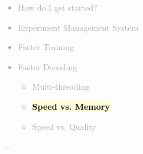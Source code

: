 \documentclass[landscape]{uedslides2C}
\newcommand{\currenttopic}[1]{\colorbox{lightyellow}{\textcolor{black}{\bf #1}}}
\begin{document}
\vspace{-5mm}
\textcolor{darkgrey}{
\begin{itemize} \itemsep -1mm
\item {How do I get started?}
\item {Experiment Management System}
\item {Faster Training}
\item {Faster Decoding}
  \begin{itemize}
  \item {Multi-threading}
  \item \currenttopic{Speed vs. Memory}
  \item Speed vs. Quality
  \end{itemize}
\end{itemize}
...
}



\end{document}
